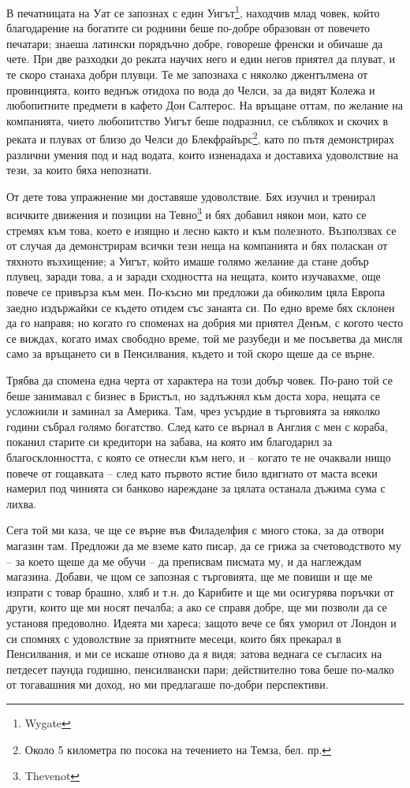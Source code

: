 \documentclass[12pt]{book}
\begin{document}
В печатницата на Уат се запознах с един Уигът\footnote{Wygate}, находчив млад човек, който благодарение на богатите си роднини беше по-добре образован от повечето печатари; знаеша латински порядъчно добре, говореше френски и обичаше да чете. При две разходки до реката научих него и един негов приятел да плуват, и те скоро станаха добри плувци. Те ме запознаха с няколко джентълмена от провинцията, които веднъж отидоха по вода до Челси, за да видят Колежа и любопитните предмети в кафето Дон Салтерос. На връщане оттам, по желание на компанията, чието любопитство Уигът беше подразнил, се съблякох и скочих в реката и плувах от близо до Челси до Блекфрайърс\footnote{Около 5 километра по посока на течението на Темза, бел. пр.}, като по пътя демонстрирах различни умения под и над водата, които изненадаха и доставиха удоволствие на тези, за които бяха непознати.

От дете това упражнение ми доставяше удоволствие. Бях изучил и тренирал всичките движения и позиции на Тевно\footnote{Thevenot} и бях добавил някои мои, като се стремях към това, което е изящно и лесно както и към полезното. Възползвах се от случая да демонстрирам всички тези неща на компанията и бях поласкан от тяхното възхищение; а Уигът, който имаше голямо желание да стане добър плувец, заради това, а и заради сходността на нещата, които изучавахме, още повече се привърза към мен. По-късно ми предложи да обиколим цяла Европа заедно издържайки се където отидем със занаята си. По едно време бях склонен да го направя; но когато го споменах на добрия ми приятел Денъм, с когото често се виждах, когато имах свободно време, той ме разубеди и ме посъветва да мисля само за връщането си в Пенсилвания, където и той скоро щеше да се върне.

Трябва да спомена една черта от характера на този добър човек. По-рано той се беше занимавал с бизнес в Бристъл, но задлъжнял към доста хора, нещата се усложнили и заминал за Америка. Там, чрез усърдие в търговията за няколко години събрал голямо богатство. След като се върнал в Англия с мен с кораба, поканил старите си кредитори на забава, на която им благодарил за благосклонността, с която се отнесли към него, и – когато те не очаквали нищо повече от гощавката – след като първото ястие било вдигнато от маста всеки намерил под чинията си банково нареждане за цялата останала дъжима сума с лихва. 

Сега той ми каза, че ще се върне във Филаделфия с много стока, за да отвори магазин там. Предложи да ме вземе като писар, да се грижа за счетоводството му – за което щеше да ме обучи – да преписвам писмата му, и да наглеждам магазина. Добави, че щом се запозная с търговията, ще ме повиши и ще ме изпрати с товар брашно, хляб и т.н. до Карибите и ще ми осигурява поръчки от други, които ще ми носят печалба; а ако се справя добре, ще ми позволи да се установя предоволно. Идеята ми хареса; защото вече се бях уморил от Лондон и си спомнях с удоволствие за приятните месеци, които бях прекарал в Пенсилвания, и ми се искаше отново да я видя; затова веднага се съгласих на петдесет паунда годишно, пенсилвански пари; действително това беше по-малко от тогавашния ми доход, но ми предлагаше по-добри перспективи.
\end{document}
